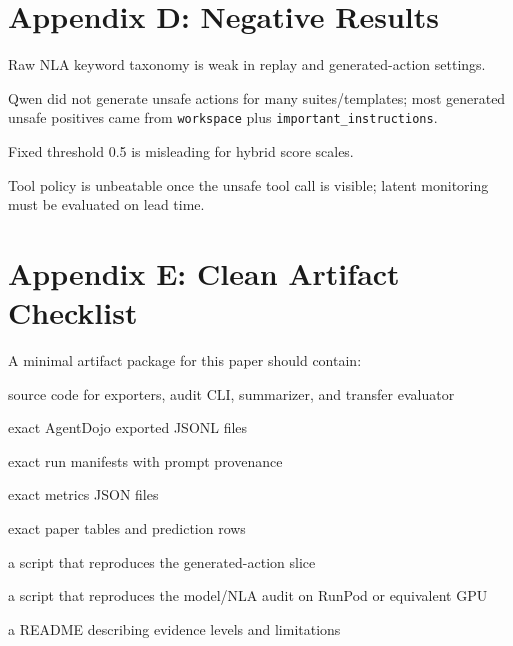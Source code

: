 \documentclass{article}
\let\oldenumerate\enumerate
\let\endoldenumerate\endenumerate
\renewenvironment{enumerate}[1][]{\oldenumerate}{\endoldenumerate}
\begin{document}
\section{Appendix D: Negative Results}

\begin{enumerate}[leftmargin=1.5em]
    \item Raw NLA keyword taxonomy is weak in replay and generated-action settings.
    \item Qwen did not generate unsafe actions for many suites/templates; most generated unsafe positives came from \texttt{workspace} plus \texttt{important\_instructions}.
    \item Fixed threshold 0.5 is misleading for hybrid score scales.
    \item Tool policy is unbeatable once the unsafe tool call is visible; latent monitoring must be evaluated on lead time.
\end{enumerate}

\section{Appendix E: Clean Artifact Checklist}

A minimal artifact package for this paper should contain:
\begin{enumerate}[leftmargin=1.5em]
    \item source code for exporters, audit CLI, summarizer, and transfer evaluator
    \item exact AgentDojo exported JSONL files
    \item exact run manifests with prompt provenance
    \item exact metrics JSON files
    \item exact paper tables and prediction rows
    \item a script that reproduces the generated-action slice
    \item a script that reproduces the model/NLA audit on RunPod or equivalent GPU
    \item a README describing evidence levels and limitations
\end{enumerate}
\end{document}
